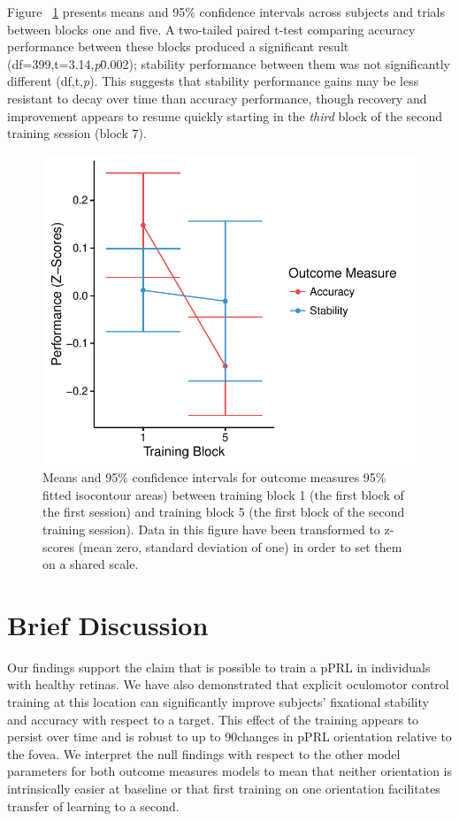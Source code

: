 Figure ~\ref{chap_1_paired_t} presents means and 95\% confidence intervals across subjects and trials between blocks one and five. A two-tailed paired t-test comparing accuracy performance between these blocks produced a significant result (df=399,t=3.14,\textit{p}\=0.002); stability performance between them was not significantly different (df,t,\textit{p}). This suggests that stability performance gains may be less resistant to decay over time than accuracy performance, though recovery and improvement appears to resume quickly starting in the \textit{third} block of the second training session (block 7). 

\begin{figure}[htbp]
\centering
\includegraphics[width=.75\linewidth,height=.75\textheight,keepaspectratio]{figures/chapter_1/paired_t_results.pdf}
\caption[Experiment 1: Performance Comparison Between First Block of Both Sessions for Both Outcome Measures]{Means and 95\% confidence intervals for outcome measures 95\% fitted isocontour areas) between training block 1 (the first block of the first session) and training block 5 (the first block of the second training session). Data in this figure have been transformed to z-scores (mean zero, standard deviation of one) in order to set them on a shared scale.}\label{chap_1_paired_t}
\end{figure}

\section{Brief Discussion}

Our findings support the claim that is possible to train a pPRL in individuals with healthy retinas. We have also demonstrated that explicit oculomotor control training at this location can significantly improve subjects' fixational stability and accuracy with respect to a target. This effect of the training appears to persist over time and is robust to up to 90\degree changes in pPRL orientation relative to the fovea. We interpret the null findings with respect to the other model parameters for both outcome measures models to mean that neither orientation is intrinsically easier at baseline or that first training on one orientation facilitates transfer of learning to a second. 

